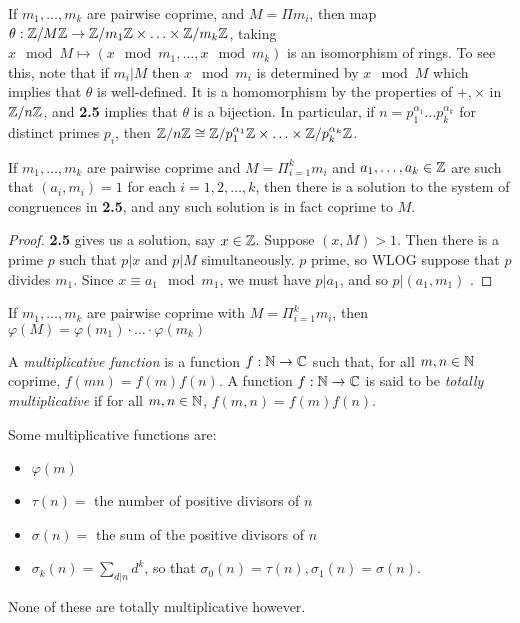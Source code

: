 \documentclass[10pt,a4paper]{article}
\begin{document}
If $m_1,\ldots,m_k$ are pairwise coprime, and $M=\Pi m_i$, then map $\theta:\mathbb{Z}/M\mathbb{Z}\rightarrow \mathbb{Z}/m_1\mathbb{Z} \times \ldots \times \mathbb{Z}/m_k\mathbb{Z}$, taking $x \mod M \mapsto (x\mod m_1, \ldots, x\mod m_k)$ is an isomorphism of rings. To see this, note that if $m_i|M$ then $x\mod m_i$ is determined by $x\mod M$ which implies that $\theta$ is well-defined. It is a homomorphism by the properties of $+,\times$ in $\mathbb{Z}/n\mathbb{Z}$, and \textbf{2.5} implies that $\theta$ is a bijection. In particular, if $n=p_1^{\alpha_1}\ldots p_k^{\alpha_k}$ for distinct primes $p_i$, then $\mathbb{Z}/n\mathbb{Z} \cong \mathbb{Z}/p_1^{\alpha_1}\mathbb{Z}\times\ldots\times\mathbb{Z}/p_k^{\alpha_k}\mathbb{Z}$.

\begin{corollary}
If $m_1,\ldots,m_k$ are pairwise coprime and $M = \Pi_{i=1}^k m_i$ and $a_1,\ldots,a_k \in \mathbb{Z}$ are such that $(a_i,m_i) = 1$ for each $i=1,2,\ldots,k$, then there is a solution to the system of congruences in \textbf{2.5}, and any such solution is in fact coprime to $M$.
\end{corollary}

\begin{proof}
\textbf{2.5} gives us a solution, say $x\in\mathbb{Z}$. Suppose $(x,M)>1$. Then there is a prime $p$ such that $p|x$ and $p|M$ simultaneously. $p$ prime, so WLOG suppose that $p$ divides $m_1$. Since $x\equiv a_1\mod m_1$, we must have $p|a_1$, and so $p|(a_1,m_1)$ \contr.
\end{proof}

\begin{corollary}
If $m_1,\ldots, m_k$ are pairwise coprime with $M=\Pi_{i=1}^k m_i$, then $\varphi(M)=\varphi(m_1)\cdot\ldots\cdot\varphi(m_k)$
\end{corollary}
A \emph{multiplicative function} is a function $f:\mathbb{N}\rightarrow\mathbb{C}$ such that, for all $m,n \in\mathbb{N}$ coprime, $f(mn)=f(m)f(n)$. A function $f:\mathbb{N}\rightarrow\mathbb{C}$ is said to be \emph{totally multiplicative} if for all $m,n\in\mathbb{N}$, $f(m,n)=f(m)f(n)$.

Some multiplicative functions are:
\begin{itemize}
\item $\varphi(m)$
\item $\tau(n) = $ the number of positive divisors of $n$
\item $\sigma(n) = $ the sum of the positive divisors of $n$
\item $\sigma_k(n) = \sum_{d|n} d^k$, so that $\sigma_0(n) = \tau(n), \sigma_1(n) = \sigma(n)$.
\end{itemize}
None of these are totally multiplicative however.
\end{document}
